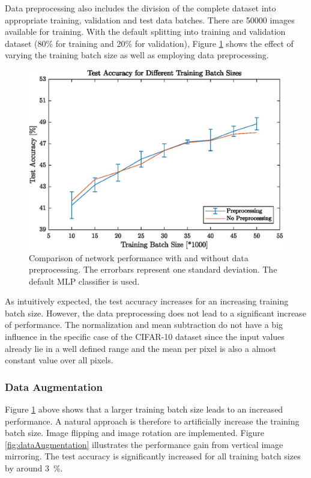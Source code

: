   	Data preprocessing also includes the division of the complete dataset into appropriate training, validation and test data batches. There are 50000 images available for training. With the default splitting into training and validation dataset (80\% for training and 20\% for validation), Figure \ref{fig:dataPreprocessing} shows the effect of varying the training batch size as well as employing data preprocessing.

  	\begin{figure}
  		\centering
   		\includegraphics{images/dataPreprocessing}
   		\caption{Comparison of network performance with and without data preprocessing. The errorbars represent one standard deviation. The default MLP classifier is used.}
   		\label{fig:dataPreprocessing}
   	\end{figure}

   	As intuitively expected, the test accuracy increases for an increasing training batch size. However, the data preprocessing does not lead to a significant increase of performance. The normalization and mean subtraction do not have a big influence in the specific case of the CIFAR-10 dataset since the input values already lie in a well defined range and the mean per pixel is also a almost constant value over all pixels.

\subsubsection{Data Augmentation}

Figure \ref{fig:dataPreprocessing} above shows that a larger training batch size leads to an increased performance. A natural approach is therefore to artificially increase the training batch size. Image flipping and image rotation are implemented. Figure \ref{fig:dataAugmentation} illustrates the performance gain from vertical image mirroring. The test accuracy is significantly increased for all training batch sizes by around \SI{3}{\percent}.


